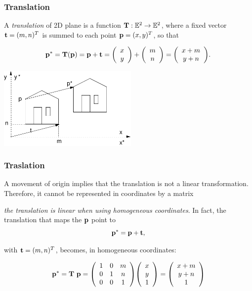 \documentclass{beamer}
\begin{document}
\begin{frame}\frametitle{Translation}\small

\vfill

A \emph{translation} of 2D plane is a function ${\bf T}: \mathbb{E}^{2}\rightarrow \mathbb{E}^{2}$, where a fixed vector ${\bf t} = (m, n)^T$ is summed to each point ${\bf p} = (x, y)^T$, so that

\[
{\bf p}^* = {\bf T}({\bf p}) = {\bf p} + {\bf t} =
{\left(\begin{array}{cccccccccccccccccccc}x \\ y\end{array}\right)} + {\left(\begin{array}{cccccccccccccccccccc}m \\ n\end{array}\right)} =
{\left(\begin{array}{cccccccccccccccccccc}x+m \\ y+n\end{array}\right)} .
\]

\vfill
\centering\includegraphics[height=40mm]{images/traslazione}
\vfill
\end{frame}
\begin{frame}\frametitle{Traslation}\small

\vfill
A movement of origin implies that the translation is not a linear transformation. Therefore, it cannot be represented in coordinates by a matrix

\vfill

\emph{the translation is linear when using homogeneous coordinates}. In fact, the translation that maps the ${\bf p}$ point to
\[
{\bf p}^*={\bf p}+{\bf t},
\]

with ${\bf t}=(m,n)^T$, becomes, in homogeneous coordinates:

\[
{\bf p}^* = {\bf T}\ {\bf p} =
{\left(\begin{array}{cccccccccccccccccccccccccccc}
1 &  0 &  m\\
0 &  1 &  n\\
0 &  0 &  1
\end{array}\right)}
{\left(\begin{array}{cccccccccccccccccccc} x \\  y \\  1 \end{array}\right)}
=
{\left(\begin{array}{cccccccccccccccccccc} x+m \\ y+n \\ 1\end{array}\right)}
\]

\vfill
\end{frame}
\end{document}
